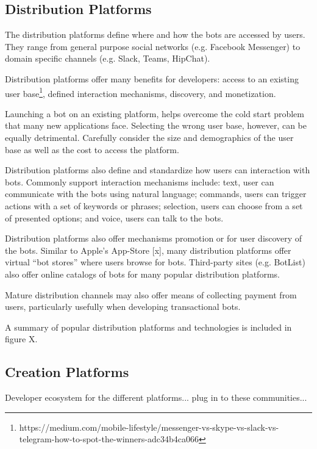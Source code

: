 \documentclass{sig-alternate}
\begin{document}
	\subsection{Distribution Platforms}
	The distribution platforms define where and how the bots are accessed by users. They range from general purpose social networks (e.g. Facebook Messenger) to domain specific channels (e.g. Slack, Teams, HipChat).  

	Distribution platforms offer many benefits for developers: access to an existing user base\footnote{https://medium.com/mobile-lifestyle/messenger-vs-skype-vs-slack-vs-telegram-how-to-spot-the-winners-adc34b4ca066\label{How_to_spot_the_winners}}, defined interaction mechanisms, discovery, and monetization.  

	Launching a bot on an existing platform, helps overcome the cold start problem that many new applications face. Selecting the wrong user base, however, can be equally detrimental. Carefully consider the size and demographics of the user base as well as the cost to access the platform. 

	Distribution platforms also define and standardize how users can interaction with bots.  Commonly support interaction mechanisms include: text, user can communicate with the bots using natural language; commands, users can trigger actions with a set of keywords or phrases; selection, users can choose from a set of presented options; and voice, users can talk to the bots.

	Distribution platforms also offer mechanisms promotion or for user discovery of the bots. Similar to Apple's App-Store [x], many distribution platforms offer virtual ``bot stores'' where users browse for bots. Third-party sites (e.g. BotList) also offer online catalogs of bots for many popular distribution platforms. 

	Mature distribution channels may also offer means of collecting payment from users, particularly usefully when developing transactional bots.

	A summary of popular distribution platforms and technologies is included in figure X.

	\subsection{Creation Platforms}
	Developer ecosystem for the different platforms...  plug in to these communities...
\end{document}
